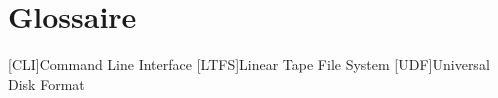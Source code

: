 
\chapter*{Glossaire}
\begin{acronym}
	[CLI]{Command Line Interface}
	[LTFS]{Linear Tape File System}
	[UDF]{Universal Disk Format}
\end{acronym}
